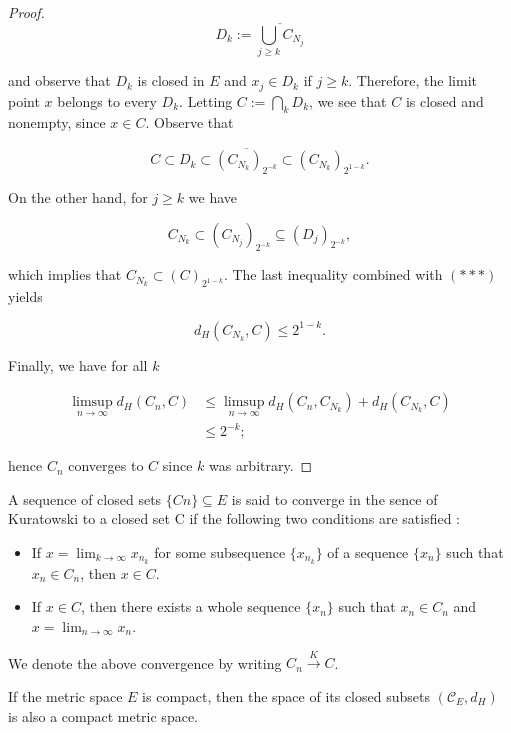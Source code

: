 \documentclass[12pt]{article}
\begin{document}
{\begin{proof}
    $$D_k := \overline{\bigcup_{j \ge k} C_{N_j}}$$
    
    and observe that $D_k$ is closed in $E$ and $x_j \in D_k$ if $j \ge k$. Therefore, the limit point $x$ belongs to every $D_k$. Letting $C := \bigcap_k D_k$, we see that $C$ is closed and nonempty, since $x \in C$. Observe that
    
    \begin{equation*}
        C \subset D_k \subset \overline{(C_{N_k})_{2^{-k}}} \subset (C_{N_k})_{2^{1-k}}. \tag{***}
    \end{equation*}
    
    On the other hand, for $j \ge k$ we have
    
    $$C_{N_k} \subset (C_{N_j})_{2^{-k}} \subseteq (D_j)_{2^{-k}},$$
    
    which implies that $C_{N_k} \subset (C)_{2^{1-k}}$. The last inequality combined with $(***)$ yields
    
    $$d_H(C_{N_k}, C) \le 2^{1-k}.$$
    
    Finally, we have for all $k$
    
    $$\begin{aligned} \limsup_{n \to \infty} d_H(C_n, C) &\le \limsup_{n \to \infty} d_H(C_n, C_{N_k}) + d_H(C_{N_k}, C) \\ &\le 2^{-k}; \end{aligned}$$
    
    hence $C_n$ converges to $C$ since $k$ was arbitrary.
\end{proof}


\begin{definition}
    A sequence of closed sets $\{Cn\} \subseteq E$ is said to converge in the sence of Kuratowski to a closed set C if the following two conditions are satisfied : 
    \begin{itemize}
        \item[(i)] If $x = \lim_{k \to \infty} x_{n_k}$ for some subsequence 
        $\{x_{n_k}\}$ of a sequence $\{x_n\}$ such that $x_n \in C_n$, 
        then $x \in C$.
        \item[(ii)] If $x \in C$, then there exists a whole sequence $\{x_n\}$ 
        such that $x_n \in C_n$ and $x = \lim_{n \to \infty} x_n$.
    \end{itemize}
    We denote the above convergence by writing $C_n \xrightarrow{K} C$.
\end{definition}

\begin{theorem}[Blaschke]
    If the metric space $E$ is compact, then the space of its closed subsets $(\mathcal{C}_E, d_H)$ is also a compact metric space.
\end{theorem}

}
\end{document}
